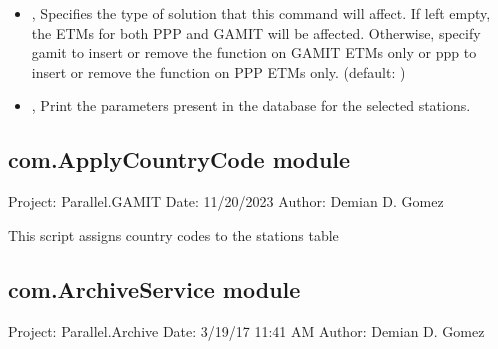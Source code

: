 \documentclass[letterpaper,10pt,english]{sphinxmanual}
\begin{document}
\begin{itemize}
\item {} 
\sphinxAtStartPar
{\hyperref[\detokenize{com:AlterETM.py--soln}]{}} , {\hyperref[\detokenize{com:AlterETM.py---solution_type}]{}}  \sphinxhyphen{} Specifies the type of solution that this command will affect. If left empty, the ETMs for both PPP and GAMIT will be affected. Otherwise, specify gamit to insert or remove the function on GAMIT ETMs only or ppp to insert or remove the function on PPP ETMs only. (default: )

\item {} 
\sphinxAtStartPar
{\hyperref[\detokenize{com:AlterETM.py--print}]{}}, {\hyperref[\detokenize{com:AlterETM.py---print_params}]{}} \sphinxhyphen{} Print the parameters present in the database for the selected stations.

\end{itemize}


\subsection{com.ApplyCountryCode module}
\label{\detokenize{com:module-com.ApplyCountryCode}}\label{\detokenize{com:com-applycountrycode-module}}
\sphinxAtStartPar
Project: Parallel.GAMIT
Date: 11/20/2023
Author: Demian D. Gomez

\sphinxAtStartPar
This script assigns country codes to the stations table


\subsection{com.ArchiveService module}
\label{\detokenize{com:module-com.ArchiveService}}\label{\detokenize{com:com-archiveservice-module}}
\sphinxAtStartPar
Project: Parallel.Archive
Date: 3/19/17 11:41 AM
Author: Demian D. Gomez
\end{document}
